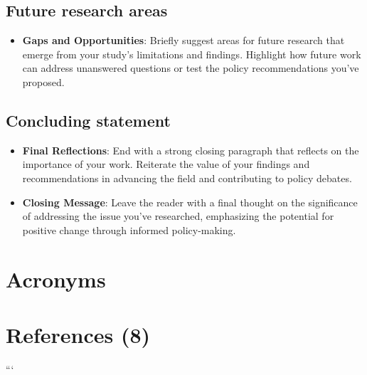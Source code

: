 \documentclass[
  12pt,
]{article}
\providecommand{\tightlist}{%
  \setlength{\itemsep}{0pt}\setlength{\parskip}{0pt}}\usepackage{longtable,booktabs,array}
\begin{document}
\subsection{Future research areas}\label{future-research-areas}

\begin{itemize}
\tightlist
\item
  \textbf{Gaps and Opportunities}: Briefly suggest areas for future
  research that emerge from your study's limitations and findings.
  Highlight how future work can address unanswered questions or test the
  policy recommendations you've proposed.
\end{itemize}

\subsection{Concluding statement}\label{concluding-statement}

\begin{itemize}
\item
  \textbf{Final Reflections}: End with a strong closing paragraph that
  reflects on the importance of your work. Reiterate the value of your
  findings and recommendations in advancing the field and contributing
  to policy debates.
\item
  \textbf{Closing Message}: Leave the reader with a final thought on the
  significance of addressing the issue you've researched, emphasizing
  the potential for positive change through informed policy-making.
\end{itemize}

\section{Acronyms}\label{acronyms}

\section{References (8)}\label{references-8}

```
\end{document}
